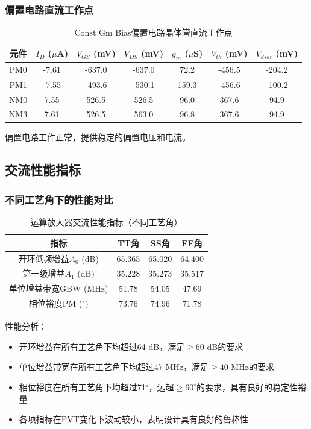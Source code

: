 \documentclass[UTF8,12pt,a4paper]{ctexart}
\begin{document}
\subsubsection{偏置电路直流工作点}

\begin{table}[h]
\centering
\caption{Const Gm Bias偏置电路晶体管直流工作点}
\begin{tabular}{|c|c|c|c|c|c|c|}
\hline
\textbf{元件} & \textbf{$I_D$ ($\mu$A)} & \textbf{$V_{GS}$ (mV)} & \textbf{$V_{DS}$ (mV)} & \textbf{$g_m$ ($\mu$S)} & \textbf{$V_{th}$ (mV)} & \textbf{$V_{dsat}$ (mV)} \\
\hline
PM0 & -7.61 & -637.0 & -637.0 & 72.2 & -456.5 & -204.2 \\
PM1 & -7.55 & -493.6 & -530.1 & 159.3 & -456.6 & -100.2 \\
NM0 & 7.55 & 526.5 & 526.5 & 96.0 & 367.6 & 94.9 \\
NM3 & 7.61 & 526.5 & 563.0 & 96.8 & 367.6 & 94.9 \\
\hline
\end{tabular}
\end{table}

偏置电路工作正常，提供稳定的偏置电压和电流。

\subsection{交流性能指标}

\subsubsection{不同工艺角下的性能对比}

\begin{table}[h]
\centering
\caption{运算放大器交流性能指标（不同工艺角）}
\begin{tabular}{|c|c|c|c|}
\hline
\textbf{指标} & \textbf{TT角} & \textbf{SS角} & \textbf{FF角} \\
\hline
开环低频增益$A_0$ (dB) & 65.365 & 65.020 & 64.400 \\
第一级增益$A_1$ (dB) & 35.228 & 35.273 & 35.517 \\
单位增益带宽GBW (MHz) & 51.78 & 54.05 & 47.69 \\
相位裕度PM ($^\circ$) & 73.76 & 74.96 & 71.78 \\
\hline
\end{tabular}
\end{table}

性能分析：
\begin{itemize}
    \item 开环增益在所有工艺角下均超过64 dB，满足$\geq 60$ dB的要求
    \item 单位增益带宽在所有工艺角下均超过47 MHz，满足$\geq 40$ MHz的要求
    \item 相位裕度在所有工艺角下均超过71$^\circ$，远超$\geq 60^\circ$的要求，具有良好的稳定性裕量
    \item 各项指标在PVT变化下波动较小，表明设计具有良好的鲁棒性
\end{itemize}
\end{document}
